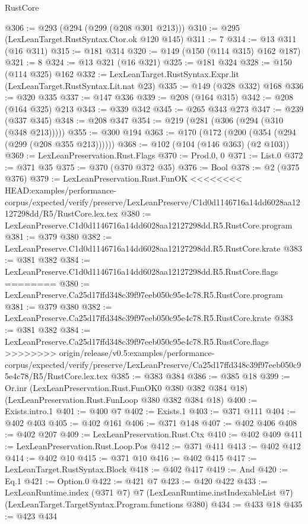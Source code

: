 \begin{lexlean}{RustCore}
\begin{coremodule}
{\begin{coremodule}
{{{{{@306 := @293 (@294 (@299 (@208 @301 @213)))
@310 := @295 (LexLeanTarget.RustSyntax.Ctor.ok @120 @145)
@311 := 7
@314 := @13 @311 (@16 @311)
@315 := @181 @314
@320 := @149 (@150 (@114 @315) @162 @187)
@321 := 8
@324 := @13 @321 (@16 @321)
@325 := @181 @324
@328 := @150 (@114 @325) @162
@332 := LexLeanTarget.RustSyntax.Expr.lit (LexLeanTarget.RustSyntax.Lit.nat @23)
@335 := @149 (@328 @332) @168
@336 := @320 @335
@337 := @147 @336
@339 := @208 (@164 @315)
@342 := @208 (@164 @325) @213
@343 := @339 @342
@345 := @265 @343 @273
@347 := @239 (@337 @345)
@348 := @208 @347
@354 := @219 (@281 (@306 (@294 (@310 (@348 @213)))))
@355 := @300 @194
@363 := @170 (@172 (@200 (@354 (@294 (@299 (@208 @355 @213))))))
@368 := @102 (@104 (@146 @363) (@2 @103))
@369 := LexLeanPreservation.Rust.Flags
@370 := Prod.{0, 0}
@371 := List.{0}
@372 := @371 @35
@375 := @370 (@370 @372 @35)
@376 := Bool
@378 := @2 (@375 @376)
@379 := LexLeanPreservation.Rust.FunOK
<<<<<<<< HEAD:examples/performance-corpus/expected/verify/preserve/LexLeanPreserve/C1d0d1146716a14dd6028aa12127298dd/R5/RustCore.lex.tex
@380 := LexLeanPreserve.C1d0d1146716a14dd6028aa12127298dd.R5.RustCore.program
@381 := @379 @380
@382 := LexLeanPreserve.C1d0d1146716a14dd6028aa12127298dd.R5.RustCore.krate
@383 := @381 @382
@384 := LexLeanPreserve.C1d0d1146716a14dd6028aa12127298dd.R5.RustCore.flags
========
@380 := LexLeanPreserve.Ca25d17ffd348c39f97eeb050c95e4c78.R5.RustCore.program
@381 := @379 @380
@382 := LexLeanPreserve.Ca25d17ffd348c39f97eeb050c95e4c78.R5.RustCore.krate
@383 := @381 @382
@384 := LexLeanPreserve.Ca25d17ffd348c39f97eeb050c95e4c78.R5.RustCore.flags
>>>>>>>> origin/release/v0.5:examples/performance-corpus/expected/verify/preserve/LexLeanPreserve/Ca25d17ffd348c39f97eeb050c95e4c78/R5/RustCore.lex.tex
@385 := @383 @384
@386 := @385 @18
@399 := Or.inr
    (LexLeanPreservation.Rust.FunOK0 @380 @382 @384 @18)
    (LexLeanPreservation.Rust.FunLoop @380 @382 @384 @18)
@400 := Exists.intro.{1}
@401 := @400 @7
@402 := Exists.{1}
@403 := @371 @111
@404 := @402 @403
@405 := @402 @161
@406 := @371 @148
@407 := @402 @406
@408 := @402 @207
@409 := LexLeanPreservation.Rust.Ctx
@410 := @402 @409
@411 := LexLeanPreservation.Rust.Loop.Pos
@412 := @371 @411
@413 := @402 @412
@414 := @402 @10
@415 := @371 @10
@416 := @402 @415
@417 := LexLeanTarget.RustSyntax.Block
@418 := @402 @417
@419 := And
@420 := Eq.{1}
@421 := Option.{0}
@422 := @421 @7
@423 := @420 @422
@433 := LexLeanRuntime.index
    (@371 @7)
    @7
    (LexLeanRuntime.instIndexableList @7)
    (LexLeanTarget.TargetSyntax.Program.functions @380)
@434 := @433 @18
@435 := @423 @434
}}}}}
\end{coremodule}}
\end{coremodule}
\end{lexlean}
